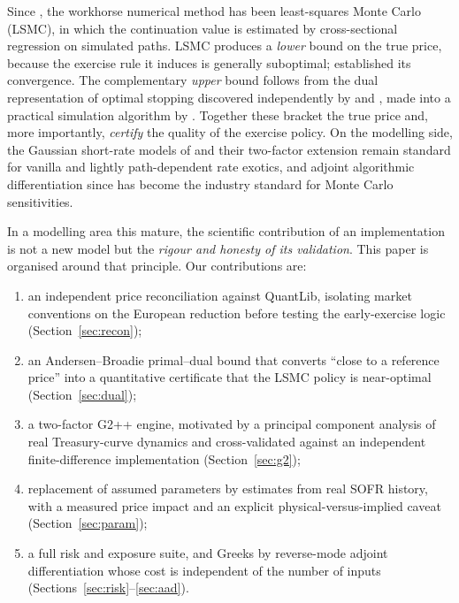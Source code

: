 \documentclass[11pt]{article}
\theoremstyle{plain}
\theoremstyle{definition}
\begin{document}
Since \cite{LS2001}, the workhorse numerical method has been least-squares Monte Carlo (LSMC),
in which the continuation value is estimated by cross-sectional regression on simulated paths.
LSMC produces a \emph{lower} bound on the true price, because the exercise rule it induces is
generally suboptimal; \cite{CLP2002} established its convergence. The complementary
\emph{upper} bound follows from the dual representation of optimal stopping discovered
independently by \cite{Rogers2002} and \cite{HaughKogan2004}, made into a practical simulation
algorithm by \cite{AndersenBroadie2004}. Together these bracket the true price and, more
importantly, \emph{certify} the quality of the exercise policy. On the modelling side, the
Gaussian short-rate models of \cite{HullWhite1990} and their two-factor extension
\cite{BrigoMercurio2006} remain standard for vanilla and lightly path-dependent rate exotics,
and adjoint algorithmic differentiation since \cite{GilesGlasserman2006} has become the
industry standard for Monte Carlo sensitivities.

In a modelling area this mature, the scientific contribution of an implementation is not a new
model but the \emph{rigour and honesty of its validation}. This paper is organised around that
principle. Our contributions are:
\begin{enumerate}[nosep,leftmargin=1.4em]
  \item an independent price reconciliation against QuantLib, isolating market conventions on
        the European reduction before testing the early-exercise logic (Section~\ref{sec:recon});
  \item an Andersen--Broadie primal--dual bound that converts ``close to a reference price''
        into a quantitative certificate that the LSMC policy is near-optimal
        (Section~\ref{sec:dual});
  \item a two-factor G2++ engine, motivated by a principal component analysis of real
        Treasury-curve dynamics and cross-validated against an independent finite-difference
        implementation (Section~\ref{sec:g2});
  \item replacement of assumed parameters by estimates from real SOFR history, with a measured
        price impact and an explicit physical-versus-implied caveat (Section~\ref{sec:param});
  \item a full risk and exposure suite, and Greeks by reverse-mode adjoint differentiation
        whose cost is independent of the number of inputs (Sections~\ref{sec:risk}--\ref{sec:aad}).
\end{enumerate}
\end{document}
